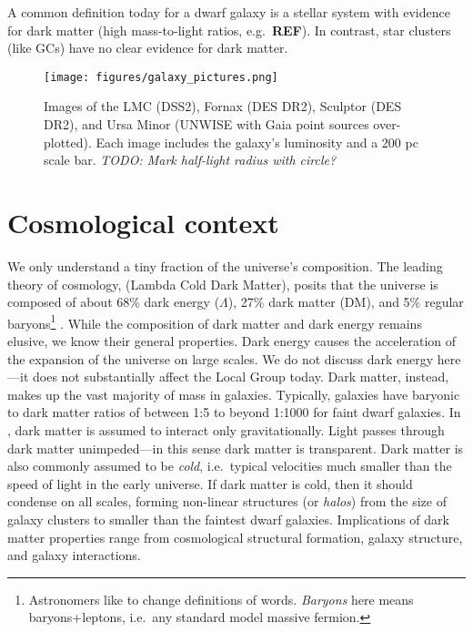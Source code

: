 A common definition today for a dwarf galaxy is a stellar system with
evidence for dark matter (high mass-to-light ratios, e.g.~\textbf{REF}).
In contrast, star clusters (like GCs) have no clear evidence for dark
matter.

\begin{figure}
\centering
\texttt{[image: figures/galaxy\_pictures.png]}
\caption[Dwarf Galaxy Pictures]{Images of the LMC (DSS2), Fornax (DES
DR2), Sculptor (DES DR2), and Ursa Minor (UNWISE with Gaia point sources
over-plotted). Each image includes the galaxy's luminosity and a 200 pc
scale bar. \emph{TODO: Mark half-light radius with
circle?}}\label{fig:galaxy_images}
\end{figure}

\section{Cosmological context}\label{cosmological-context}

We only understand a tiny fraction of the universe's composition. The
leading theory of cosmology, \LCDM (Lambda Cold Dark Matter), posits
that the universe is composed of about 68\% dark energy (\(\Lambda\)),
27\% dark matter (DM), and 5\% regular baryons\footnote{Astronomers like
  to change definitions of words. \emph{Baryons} here means
  baryons+leptons, i.e.~any standard model massive fermion.}
\citep{planckcollaboration+2020}. While the composition of dark matter
and dark energy remains elusive, we know their general properties. Dark
energy causes the acceleration of the expansion of the universe on large
scales. We do not discuss dark energy here---it does not substantially
affect the Local Group today. Dark matter, instead, makes up the vast
majority of mass in galaxies. Typically, galaxies have baryonic to dark
matter ratios of between 1:5 to beyond 1:1000 for faint dwarf galaxies.
In \LCDM, dark matter is assumed to interact only gravitationally. Light
passes through dark matter unimpeded---in this sense dark matter is
transparent. Dark matter is also commonly assumed to be \emph{cold},
i.e.~typical velocities much smaller than the speed of light in the
early universe. If dark matter is cold, then it should condense on all
scales, forming non-linear structures (or \emph{halos}) from the size of
galaxy clusters to smaller than the faintest dwarf galaxies.
Implications of dark matter properties range from cosmological
structural formation, galaxy structure, and galaxy interactions.

